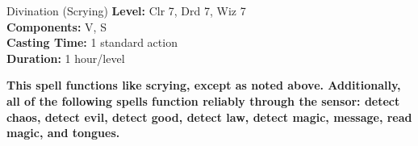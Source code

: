 {Divination (Scrying)}
{
	\textbf{Level:}
	Clr 7, Drd 7, Wiz 7\\
	\textbf{Components:}
	V, S\\
	\textbf{Casting Time:}
	1 standard action\\
	\textbf{Duration:}
	1 hour/level\\
}
{
	\textbf{	This spell functions like scrying, except as noted above. Additionally, all of the following spells function reliably through the sensor: detect chaos, detect evil, detect good, detect law, detect magic, message, read magic, and tongues.}

}
